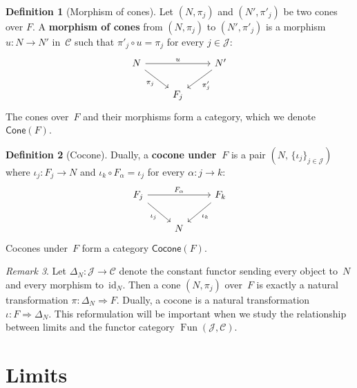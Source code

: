 \documentclass[a4paper,12pt]{book}
\DeclareMathOperator{\Fun}{Fun}
\newcommand{\id}{\mathrm{id}}
\theoremstyle{definition}
\newtheorem{definition}{Definition}[section]
\theoremstyle{plain}
\theoremstyle{remark}
\newtheorem{remark}[definition]{Remark}
\begin{document}
\begin{definition}[Morphism of cones]\label{def:cone-morphism}
Let $(N,\pi_j)$ and $(N',\pi'_j)$ be two cones over $F$.
A \textbf{morphism of cones} from $(N,\pi_j)$ to $(N',\pi'_j)$
is a morphism $u\colon N\to N'$ in~$\mathcal{C}$ such that
$\pi'_j \circ u = \pi_j$ for every $j\in\mathcal{J}$:
\[
\begin{tikzcd}
N \arrow[rr, "u"] \arrow[dr, "\pi_j"'] && N' \arrow[dl, "\pi'_j"] \\
& F_j &
\end{tikzcd}
\]
The cones over~$F$ and their morphisms form a category,
which we denote $\mathsf{Cone}(F)$.
\end{definition}

\begin{definition}[Cocone]\label{def:cocone}
Dually, a \textbf{cocone under~$F$} is a pair
$(N,\,\{\iota_j\}_{j\in\mathcal{J}})$ where $\iota_j\colon F_j\to N$
and $\iota_k \circ F_\alpha = \iota_j$ for every $\alpha\colon j\to k$:
\[
\begin{tikzcd}
F_j \arrow[rr, "F_\alpha"] \arrow[dr, "\iota_j"'] & & F_k \arrow[dl, "\iota_k"] \\
& N &
\end{tikzcd}
\]
Cocones under~$F$ form a category $\mathsf{Cocone}(F)$.
\end{definition}

\begin{remark}\label{rem:cone-as-nat}
Let $\Delta_N \colon \mathcal{J}\to\mathcal{C}$ denote the constant functor
sending every object to~$N$ and every morphism to~$\id_N$.
Then a cone $(N,\pi_j)$ over~$F$ is exactly a natural transformation
$\pi\colon \Delta_N \Rightarrow F$.
Dually, a cocone is a natural transformation $\iota\colon F\Rightarrow\Delta_N$.
This reformulation will be important when we study the relationship
between limits and the functor category $\Fun(\mathcal{J},\mathcal{C})$.
\end{remark}


\section{Limits}\label{sec:limits}
\end{document}
